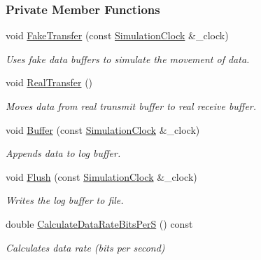 \subsubsection*{Private Member Functions}
\begin{DoxyCompactItemize}
\item 
void \hyperlink{classosse_1_1collaborate_1_1_channel_afa3d5712ec01f8ebe7c332c6f70b6f34}{Fake\+Transfer} (const \hyperlink{classosse_1_1collaborate_1_1_simulation_clock}{Simulation\+Clock} \&\+\_\+clock)
\begin{DoxyCompactList}\small\item\em Uses fake data buffers to simulate the movement of data. \end{DoxyCompactList}\item 
\mbox{\label{classosse_1_1collaborate_1_1_channel_a7883ecefbb4beb76b4b4344c5b77fd4b}} 
void \hyperlink{classosse_1_1collaborate_1_1_channel_a7883ecefbb4beb76b4b4344c5b77fd4b}{Real\+Transfer} ()
\begin{DoxyCompactList}\small\item\em Moves data from real transmit buffer to real receive buffer. \end{DoxyCompactList}\item 
void \hyperlink{classosse_1_1collaborate_1_1_channel_ad63128fabbcbd8ad76512937333324f8}{Buffer} (const \hyperlink{classosse_1_1collaborate_1_1_simulation_clock}{Simulation\+Clock} \&\+\_\+clock)
\begin{DoxyCompactList}\small\item\em Appends data to log buffer. \end{DoxyCompactList}\item 
void \hyperlink{classosse_1_1collaborate_1_1_channel_a557ea9a5efc851158e8faac44e7727dd}{Flush} (const \hyperlink{classosse_1_1collaborate_1_1_simulation_clock}{Simulation\+Clock} \&\+\_\+clock)
\begin{DoxyCompactList}\small\item\em Writes the log buffer to file. \end{DoxyCompactList}\item 
double \hyperlink{classosse_1_1collaborate_1_1_channel_a82f92a2447146dccb81de8557994afb9}{Calculate\+Data\+Rate\+Bits\+PerS} () const
\begin{DoxyCompactList}\small\item\em Calculates data rate (bits per second) \end{DoxyCompactList}\item 

\end{DoxyCompactItemize}
